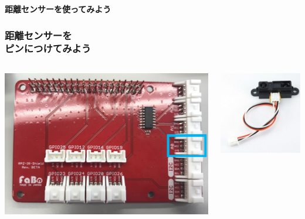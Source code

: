 \begin{frame}[plain]
    \begin{center}
        \vspace{48pt}
        {\huge\bf 距離センサーを使ってみよう}
    \end{center}
\end{frame}

\begin{frame}[fragile]
    \frametitle{距離センサーを\\ピンにつけてみよう}
    \begin{columns}
        \begin{column}{0.48\textwidth}
            \includegraphics[width=\textwidth]{images/chap05/text05-img030.png} 
        \end{column}
        \begin{column}{0.48\textwidth}
            \includegraphics[width=\textwidth]{images/chap05/text05-img023.jpg} 

\end{column}
\end{columns}
\end{frame}
